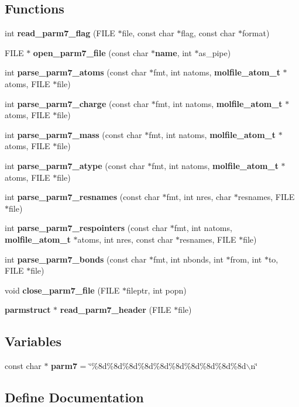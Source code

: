 \subsection*{Functions}
\begin{CompactItemize}
\item 
int {\bf read\_\-parm7\_\-flag} (FILE $\ast$file, const char $\ast$flag, const char $\ast$format)
\item 
FILE $\ast$ {\bf open\_\-parm7\_\-file} (const char $\ast${\bf name}, int $\ast$as\_\-pipe)
\item 
int {\bf parse\_\-parm7\_\-atoms} (const char $\ast$fmt, int natoms, {\bf molfile\_\-atom\_\-t} $\ast$atoms, FILE $\ast$file)
\item 
int {\bf parse\_\-parm7\_\-charge} (const char $\ast$fmt, int natoms, {\bf molfile\_\-atom\_\-t} $\ast$atoms, FILE $\ast$file)
\item 
int {\bf parse\_\-parm7\_\-mass} (const char $\ast$fmt, int natoms, {\bf molfile\_\-atom\_\-t} $\ast$atoms, FILE $\ast$file)
\item 
int {\bf parse\_\-parm7\_\-atype} (const char $\ast$fmt, int natoms, {\bf molfile\_\-atom\_\-t} $\ast$atoms, FILE $\ast$file)
\item 
int {\bf parse\_\-parm7\_\-resnames} (const char $\ast$fmt, int nres, char $\ast$resnames, FILE $\ast$file)
\item 
int {\bf parse\_\-parm7\_\-respointers} (const char $\ast$fmt, int natoms, {\bf molfile\_\-atom\_\-t} $\ast$atoms, int nres, const char $\ast$resnames, FILE $\ast$file)
\item 
int {\bf parse\_\-parm7\_\-bonds} (const char $\ast$fmt, int nbonds, int $\ast$from, int $\ast$to, FILE $\ast$file)
\item 
void {\bf close\_\-parm7\_\-file} (FILE $\ast$fileptr, int popn)
\item 
{\bf parmstruct} $\ast$ {\bf read\_\-parm7\_\-header} (FILE $\ast$file)
\end{CompactItemize}
\subsection*{Variables}
\begin{CompactItemize}
\item 
const char $\ast$ {\bf parm7} = \char`\"{}\%8d\%8d\%8d\%8d\%8d\%8d\%8d\%8d\%8d\%8d$\backslash$n\char`\"{}
\end{CompactItemize}


\subsection{Define Documentation}
